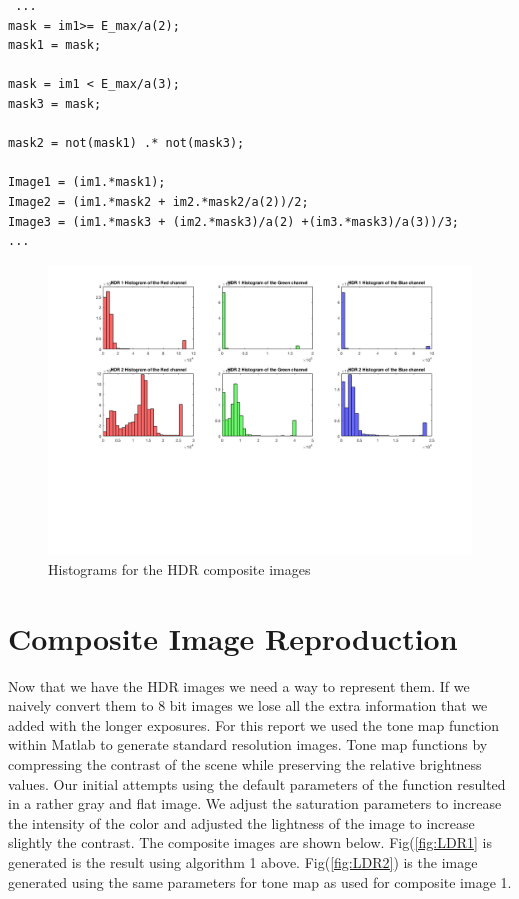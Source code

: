 \documentclass[a4paper]{article}
\begin{document}
 \begin{verbatim}
 ...
mask = im1>= E_max/a(2);
mask1 = mask;

mask = im1 < E_max/a(3);
mask3 = mask;

mask2 = not(mask1) .* not(mask3);

Image1 = (im1.*mask1);
Image2 = (im1.*mask2 + im2.*mask2/a(2))/2;
Image3 = (im1.*mask3 + (im2.*mask3)/a(2) +(im3.*mask3)/a(3))/3;
...
 \end{verbatim}
\begin{figure}[htb!]
    \begin{center}
        \includegraphics[width=\textwidth]{LDR_Histograms-Result.png}
	 \end{center}
    \caption{Histograms for the HDR composite images} 
    \label{fig:HDRhist}
\end{figure}
\section{Composite Image Reproduction}
Now that we have the HDR images we need a way to represent them.  If we naively convert them to 8 bit images we lose all the extra information that we added with the longer exposures.  For this report we used the tone map function within Matlab to generate standard resolution images.  Tone map functions by compressing the contrast of the scene while preserving the relative brightness values. Our initial attempts using the default parameters of the function resulted in a rather gray and flat image.  We adjust the saturation parameters to increase the intensity of the color and adjusted the lightness of the image to increase slightly the contrast.  The composite images are shown below.  Fig(\ref{fig:LDR1} is generated is the result using algorithm 1 above.  Fig(\ref{fig:LDR2}) is the image generated using the same parameters for tone map as used for composite image 1.  
\end{document}
